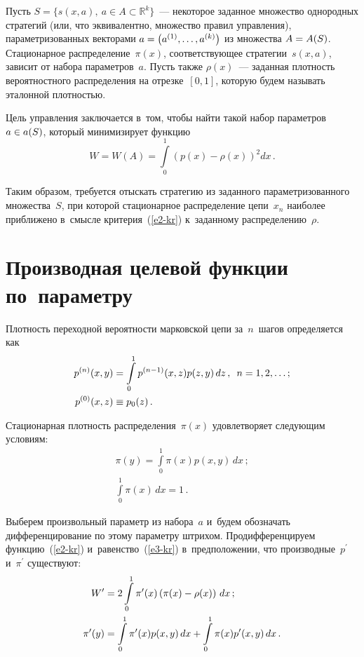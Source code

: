 \begin{multicols}{2}
  Пусть $S=\{s(x,a),\ a\in A\subset \mathbb{R}^k\}$~--- некоторое заданное 
множество однородных стратегий (или, что эквивалентно, множество правил 
управления), па\-ра\-мет\-ри\-зо\-ван\-ных векторами $a\hm= \left( a^{(1)}, \ldots , 
a^{(k)}\right)$ из множества $A\hm= A(S)$. Стационарное 
распределение~$\pi(x)$, соответствующее стратегии~$s(x,a)$, зависит от 
набора па\-ра\-мет\-ров~$a$. Пусть также $\rho(x)$~--- заданная плот\-ность 
вероятностного распределения на отрезке~$[0,1]$, которую будем называть 
эталонной плот\-ностью.
  
  Цель управления заключается в~том, чтобы \mbox{найти} такой набор па\-ра\-мет\-ров 
$a\hm\in a(S)$, который минимизирует функцию
  \begin{equation}
  W=W(A)=\int\limits_0^{1} \left( p(x)-\rho(x)\right)^2dx\,.
  \label{e2-kr}
  \end{equation}
  
  Таким образом, требуется отыскать стратегию из заданного 
параметризованного множества~$S$, при которой стационарное 
распределение цепи~$x_n$ наиболее при\-бли\-же\-но в~смыс\-ле 
критерия~(\ref{e2-kr}) к~заданному распределению~$\rho$.
  
  \section{Производная целевой функции по~параметру}
  
  Плотность переходной ве\-ро\-ят\-ности марковской цепи за~$n$~шагов 
определяется как
  \begin{align*}
  p^{(n)}(x,y)&=\int\limits_0^1 p^{(n-1)}(x,z) p(z,y)\,dz\,,\enskip
  n=1,2,\ldots;\\
  p^{(0)}(x,z)&\equiv p_0(z)\,.
  \end{align*}
  
  Стационарная плот\-ность распределения~$\pi(x)$ удовлетворяет 
сле\-ду\-ющим условиям:
  \begin{gather}
  \pi(y) = \int\limits_0^1 \pi(x) p(x,y)\,dx\,;\label{e3-kr}\\
  \int\limits_0^1\pi(x)\,dx=1\,.\label{e4-kr}
  \end{gather}
  
  Выберем произвольный параметр из набора~$a$ и~будем обозначать 
дифференцирование по этому па\-ра\-мет\-ру штри\-хом. Продифференцируем 
функцию~(\ref{e2-kr}) и~равенство~(\ref{e3-kr}) в~предположении, что 
производные~$p^\prime$ и~$\pi^\prime$ существуют:
  \begin{align}
  W^\prime &= 2\int\limits_0^1 \pi^\prime(x) \left( \pi(x)-
\rho(x)\right)\,dx\,;\notag %
\\
  \pi^\prime(y)&= \int\limits_0^1 \pi^\prime(x) p(x,y)\,dx +\int\limits_0^1 \pi(x) 
p^\prime(x,y)\,dx\,.\label{e6-kr}
  \end{align}
  

\end{multicols}
